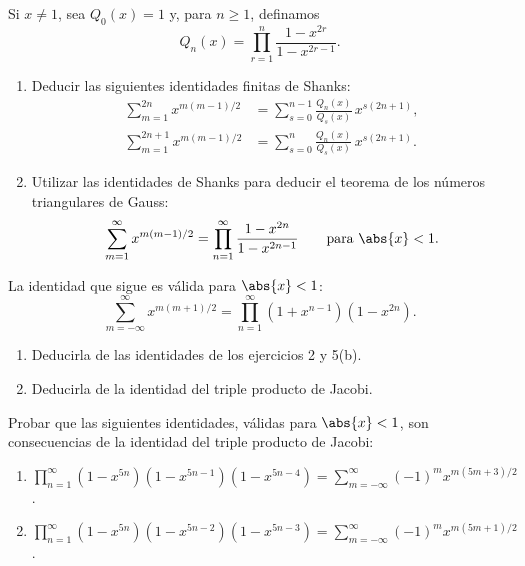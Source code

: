 \documentclass[12pt,a4paper]{book}
\begin{document}
    \begin{ejercicio}
        Si $x\neq1$, sea $Q_{0}(x)=1$ y, para $n\geq1$, definamos
        \begin{equation*}
            Q_{n}(x)=\prod_{r=1}^{n}\frac{1-x^{2r}}{1-x^{2r-1}}.
        \end{equation*}
        \begin{enumerate}
            \item[(a)] Deducir las siguientes identidades finitas de Shanks:
            \begin{align*}
                \sum_{m=1}^{2n}x^{m(m-1)/2}&=\sum_{s=0}^{n-1}\frac{Q_{n}(x)}{Q_{s}(x)}\,x^{s(2n+1)},\\
                \sum_{m=1}^{2n+1}x^{m(m-1)/2}&=\sum_{s=0}^{n}\frac{Q_{n}(x)}{Q_{s}(x)}\,x^{s(2n+1)}.
            \end{align*}
            \item[(b)] Utilizar las identidades de Shanks para deducir el teorema de los
            números triangulares de Gauss:
            \begin{equation*}
                \sum_{m=1}^{\infty}x^{m(m-1)/2}=\prod_{n=1}^{\infty}\frac{1-x^{2n}}{1-x^{2n-1}}\qquad\text{para }\abs{x}<1.
            \end{equation*}
        \end{enumerate}
    \end{ejercicio}

    \begin{ejercicio}
        La identidad que sigue es válida para $\abs{x}<1$:
        \begin{equation*}
            \sum_{m=-\infty}^{\infty}x^{m(m+1)/2}=\prod_{n=1}^{\infty}(1+x^{n-1})(1-x^{2n}).
        \end{equation*}
        \begin{enumerate}
            \item[(a)] Deducirla de las identidades de los ejercicios 2 y 5(b).
            \item[(b)] Deducirla de la identidad del triple producto de Jacobi.
        \end{enumerate}
    \end{ejercicio}

    \begin{ejercicio}
        Probar que las siguientes identidades, válidas para $\abs{x}<1$, son consecuencias de la
        identidad del triple producto de Jacobi:
        \begin{enumerate}
            \item[(a)] $\displaystyle\prod_{n=1}^{\infty}(1-x^{5n})(1-x^{5n-1})(1-x^{5n-4})=\sum_{m=-\infty}^{\infty}(-1)^{m}x^{m(5m+3)/2}$.
            \item[(b)] $\displaystyle\prod_{n=1}^{\infty}(1-x^{5n})(1-x^{5n-2})(1-x^{5n-3})=\sum_{m=-\infty}^{\infty}(-1)^{m}x^{m(5m+1)/2}$.
        \end{enumerate}
    \end{ejercicio}
\end{document}
